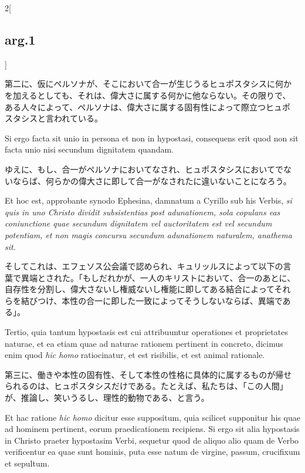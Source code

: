 \documentclass[paper=a4paper,fontsize=10pt,jafontsize=9pt,titlepage]{jlreq}
\begin{document}
\begin{paracol}{2}[\subsection{arg.1}]
\switchcolumn

第二に、仮にペルソナが、そこにおいて合一が生じうるヒュポスタシスに何か
を加えるとしても、それは、偉大さに属する何かに他ならない。その限りで、
ある人々によって、ペルソナは、偉大さに属する固有性によって際立つヒュポ
スタシスと言われている。

\switchcolumn*

Si ergo facta sit unio in persona et non in hypostasi, consequens erit
quod non sit facta unio nisi secundum dignitatem quandam.

\switchcolumn

ゆえに、もし、合一がペルソナにおいてなされ、ヒュポスタシスにおいてでな
いならば、何らかの偉大さに即して合一がなされたに違いないことになろう。

\switchcolumn*

Et hoc est, approbante synodo Ephesina, damnatum a Cyrillo sub his
Verbis, {\itshape si quis in uno Christo dividit subsistentias post
adunationem, sola copulans eas coniunctione quae secundum dignitatem
vel auctoritatem est vel secundum potentiam, et non magis concursu
secundum adunationem naturalem, anathema sit}.

\switchcolumn

そしてこれは、エフェソス公会議で認められ、キュリッルスによって以下の言
葉で異端とされた。「もしだれかが、一人のキリストにおいて、合一のあとに、
自存性を分割し、偉大さないし権威ないし権能に即してある結合によってそれ
らを結びつけ、本性の合一に即した一致によってそうしないならば、異端であ
る」。

\switchcolumn*

Tertio, quia tantum hypostasis est cui attribuuntur operationes et
proprietates naturae, et ea etiam quae ad naturae rationem pertinent
in concreto, dicimus enim quod {\itshape hic homo} ratiocinatur, et
est risibilis, et est animal rationale.

\switchcolumn

第三に、働きや本性の固有性、そして本性の性格に具体的に属するものが帰せ
られるのは、ヒュポスタシスだけである。たとえば、私たちは、「この人間」
が、推論し、笑いうるし、理性的動物である、と言う。

\switchcolumn*

Et hac ratione {\itshape hic homo} dicitur esse suppositum, quia
scilicet supponitur his quae ad hominem pertinent, eorum
praedicationem recipiens. Si ergo sit alia hypostasis in Christo
praeter hypostasim Verbi, sequetur quod de aliquo alio quam de Verbo
verificentur ea quae sunt hominis, puta esse natum de virgine, passum,
crucifixum et sepultum.


\end{paracol}
\end{document}
